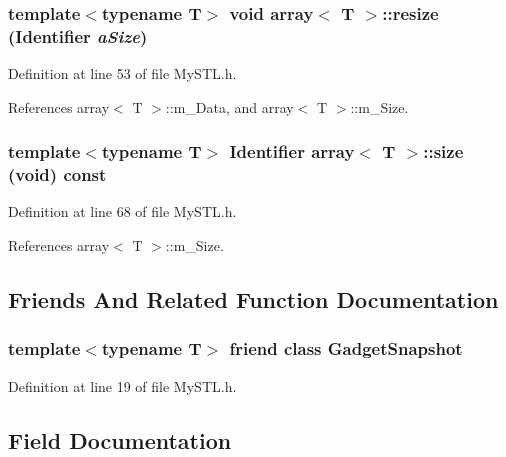 \subsubsection[{resize}]{\setlength{\rightskip}{0pt plus 5cm}template$<$typename T$>$ void {\bf array}$<$ T $>$::resize ({\bf Identifier} {\em aSize})}\label{classarray_af563fcf070f9303dc708442d47c3e2ff}


Definition at line 53 of file MySTL.h.



References array$<$ T $>$::m\_\-Data, and array$<$ T $>$::m\_\-Size.

\subsubsection[{size}]{\setlength{\rightskip}{0pt plus 5cm}template$<$typename T$>$ {\bf Identifier} {\bf array}$<$ T $>$::size (void) const}\label{classarray_a7f1f56c3838eeb9bb371c789d8db86dc}


Definition at line 68 of file MySTL.h.



References array$<$ T $>$::m\_\-Size.



\subsection{Friends And Related Function Documentation}
\subsubsection[{GadgetSnapshot}]{\setlength{\rightskip}{0pt plus 5cm}template$<$typename T$>$ friend class GadgetSnapshot}\label{classarray_a4af7d5c42d512b86461b9b927c143c22}


Definition at line 19 of file MySTL.h.



\subsection{Field Documentation}
